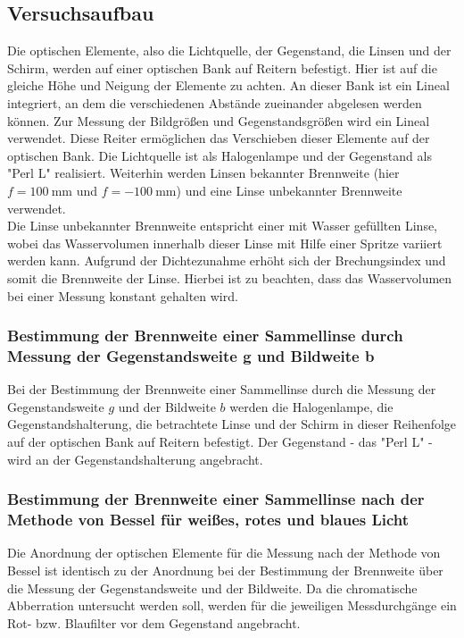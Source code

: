 \subsection{Versuchsaufbau}
\label{sec:Versuchsaufbau}

Die optischen Elemente, also die Lichtquelle, der Gegenstand, die Linsen und der
Schirm,
werden auf einer optischen Bank auf Reitern befestigt. Hier ist auf die gleiche Höhe und Neigung
der Elemente zu achten. An dieser Bank ist ein Lineal integriert,
an dem die verschiedenen Abstände zueinander abgelesen werden können.
Zur Messung der Bildgrößen und Gegenstandsgrößen wird ein Lineal verwendet.
Diese Reiter ermöglichen das Verschieben dieser Elemente auf der optischen Bank.
Die Lichtquelle ist als Halogenlampe und der Gegenstand als "Perl L" realisiert.
Weiterhin werden Linsen bekannter Brennweite (hier $f=\SI{100}{\milli\meter}$ und
$f=-\SI{100}{\milli\meter}$) und eine Linse unbekannter Brennweite verwendet. \\
Die Linse unbekannter Brennweite entspricht einer mit Wasser gefüllten Linse, wobei das Wasservolumen
innerhalb dieser Linse mit Hilfe einer Spritze variiert werden kann. Aufgrund der
Dichtezunahme erhöht sich der Brechungsindex und somit die Brennweite der Linse.
Hierbei ist zu beachten, dass das Wasservolumen bei einer Messung konstant gehalten wird.

\subsubsection{Bestimmung der Brennweite einer Sammellinse durch Messung der Gegenstandsweite g und Bildweite b}
\label{sec:gundb}
Bei der Bestimmung der Brennweite einer Sammellinse durch die Messung der Gegenstandsweite $g$ und
der Bildweite $b$ werden die Halogenlampe, die Gegenstandshalterung, die betrachtete
Linse und der Schirm
in dieser Reihenfolge auf der optischen Bank auf Reitern befestigt.
Der Gegenstand - das "Perl L" - wird an der Gegenstandshalterung angebracht.

\subsubsection{Bestimmung der Brennweite einer Sammellinse nach der Methode von Bessel für
weißes, rotes und blaues Licht}
\label{sec:bessel}
Die Anordnung der optischen Elemente für die Messung nach der Methode von Bessel ist identisch
zu der Anordnung bei der Bestimmung der Brennweite über die Messung der Gegenstandsweite und der
Bildweite.
Da die chromatische Abberration untersucht werden soll, werden für die jeweiligen
Messdurchgänge ein Rot- bzw. Blaufilter vor dem Gegenstand angebracht.

